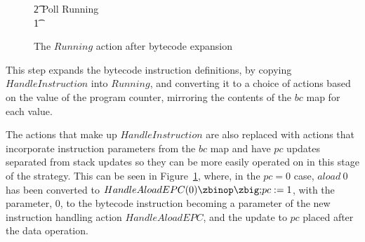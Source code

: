 \begin{figure}[t]
\begin{circus}
    \t2 \circfi \circseq Poll \circseq Running \\
    \t1 \circfi
  \end{circus}
  \caption{The $Running$ action after bytecode expansion}
  \label{bytecode-expansion-example-figure}
\end{figure}
This step expands the bytecode instruction definitions, by copying
$HandleInstruction$ into $Running$, and converting it to a choice of
actions based on the value of the program counter, mirroring the
contents of the $bc$ map for each value.

The actions that make up $HandleInstruction$ are also replaced with
actions that incorporate instruction parameters from the $bc$ map and
have $pc$ updates separated from stack updates so they can be more
easily operated on in this stage of the strategy.
This can be seen in Figure~\ref{bytecode-expansion-example-figure},
where, in the $pc = 0$ case, $aload~0$ has been converted to
$HandleAloadEPC(0) \circseq pc := 1$, with the parameter, $0$, to the
bytecode instruction becoming a parameter of the new instruction
handling action $HandleAloadEPC$, and the update to $pc$ placed after
the data operation.

